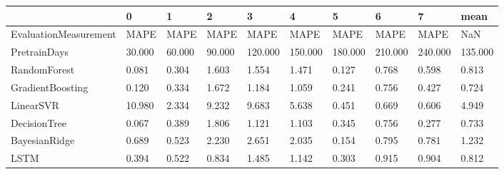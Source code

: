 \begin{tabular}{llllllllll}
\toprule
{} &      0 &      1 &      2 &       3 &       4 &       5 &       6 &       7 &    mean \\
\midrule
EvaluationMeasurement &   MAPE &   MAPE &   MAPE &    MAPE &    MAPE &    MAPE &    MAPE &    MAPE &     NaN \\
PretrainDays          & 30.000 & 60.000 & 90.000 & 120.000 & 150.000 & 180.000 & 210.000 & 240.000 & 135.000 \\
RandomForest          &  0.081 &  0.304 &  1.603 &   1.554 &   1.471 &   0.127 &   0.768 &   0.598 &   0.813 \\
GradientBoosting      &  0.120 &  0.334 &  1.672 &   1.184 &   1.059 &   0.241 &   0.756 &   0.427 &   0.724 \\
LinearSVR             & 10.980 &  2.334 &  9.232 &   9.683 &   5.638 &   0.451 &   0.669 &   0.606 &   4.949 \\
DecisionTree          &  0.067 &  0.389 &  1.806 &   1.121 &   1.103 &   0.345 &   0.756 &   0.277 &   0.733 \\
BayesianRidge         &  0.689 &  0.523 &  2.230 &   2.651 &   2.035 &   0.154 &   0.795 &   0.781 &   1.232 \\
LSTM                  &  0.394 &  0.522 &  0.834 &   1.485 &   1.142 &   0.303 &   0.915 &   0.904 &   0.812 \\
\bottomrule
\end{tabular}
